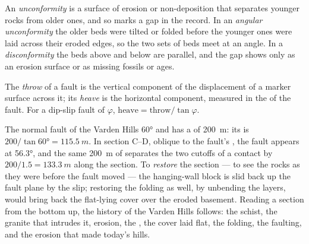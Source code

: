 \begin{definition}\label{def:b1:cross-sections:unconformity}
An \emph{unconformity} is a surface of erosion or
non-deposition that separates younger rocks from older ones, and so marks a
gap in the record. In an \emph{angular unconformity} the older beds were tilted or folded before the younger ones
were laid across their eroded edges, so the two sets of beds meet at an
angle. In a \emph{disconformity} the beds above and
below are parallel, and the gap shows only as an erosion surface or as
missing fossils or ages.
\end{definition}

\begin{definition}\label{def:b1:cross-sections:throw}
The \emph{throw} of a fault is the vertical
component of the displacement of a marker surface across it; its
\emph{heave} is the horizontal component, measured
in the  of the fault. For a dip-slip fault of  $\varphi$,
$\text{heave} = \text{throw}/\tan\varphi$.
\end{definition}

The normal fault of the Varden Hills  \ang{60} and has a  of
\qty{200}{m}: its  is $200/\tan\ang{60} = \qty{115.5}{m}$. In section
C--D, oblique to the fault's , the fault appears at
\ang{56.3}, and the same \qty{200}{m} of  separates the two cutoffs of
a contact by $200/1.5 = \qty{133.3}{m}$ along the section. To
\emph{restore} the section --- to see the rocks as they were before the
fault moved --- the hanging-wall block is slid back up the fault plane by
the slip; restoring the folding as well, by unbending the layers, would
bring back the flat-lying cover over the eroded basement. Reading a section
from the bottom up, the history of the Varden Hills follows: the schist, the
granite that intrudes it, erosion, the , the cover laid
flat, the folding, the faulting, and the erosion that made today's hills.

